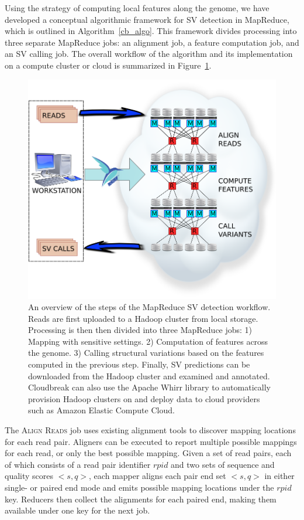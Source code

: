 Using the strategy of computing local features along the genome, we have developed a conceptual algorithmic framework for SV detection in MapReduce, which is outlined in Algorithm~\ref{cb_algo}. This framework divides processing into three separate MapReduce jobs: an alignment job, a feature computation job, and an SV calling job. The overall workflow of the algorithm and its implementation on a compute cluster or cloud is summarized in Figure~\ref{cloudbreak_workflow}.

\begin{figure}
\centering
\includegraphics[width=.8\textwidth]{figures/workflow_with_whirr.png}
\caption[An overview of the steps of the MapReduce SV detection workflow.]{An overview of the steps of the MapReduce SV detection workflow. Reads are first uploaded to a Hadoop cluster from local storage. Processing is then then divided into three MapReduce jobs: 1) Mapping with sensitive settings. 2) Computation of features across the genome. 3) Calling structural variations based on the features computed in the previous step. Finally, SV predictions can be downloaded from the Hadoop cluster and examined and annotated. Cloudbreak can also use the Apache Whirr library to automatically provision Hadoop clusters on and deploy data to cloud providers such as Amazon Elastic Compute Cloud.}
\label{cloudbreak_workflow}
\end{figure}


The \textsc{Align Reads} job uses existing alignment tools to discover mapping locations for each read pair. Aligners can be executed to report multiple possible mappings for each read, or only the best possible mapping. Given a set of read pairs, each of which consists of a read pair identifier $rpid$ and two sets of sequence and quality scores $<s,q>$, each mapper aligns each pair end set $<s,q>$ in either single- or paired end mode and emits possible mapping locations under the $rpid$ key. Reducers then collect the alignments for each paired end, making them available under one key for the next job. 

